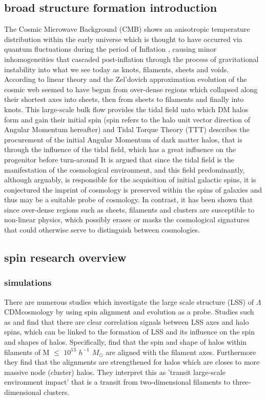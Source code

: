 \documentclass[a4paper,fleqn,usenatbib]{mnras}
\def \lcdm{$\Lambda$CDM}
\begin{document}
\subsection{broad structure formation introduction}
The Cosmic Microwave Background (CMB) shows an anisotropic temperature distribution within the early universe which is thought to have occurred via quantum fluctuations during the period of Inflation \citep{Guth_82}, causing minor inhomogeneities that cascaded post-inflation through the process of gravitational instability into what we see today as knots, filaments, sheets and voids. According to linear theory and the Zel'dovich approximation \citep{Zeldovich_70} evolution of the cosmic web seemed to have begun from over-dense regions which collapsed along their shortest axes into sheets, then from sheets to filaments and finally into knots. This large-scale bulk flow provides the tidal field unto which DM halos form and gain their initial spin (spin refers to the halo unit vector direction of Angular Momentum hereafter) and Tidal Torque Theory (TTT) describes the procurement of the initial Angular Momentum of dark matter halos, that is through the influence of the tidal field, which has a great influence on the progenitor before turn-around \citep[Holye 1949][]{Peebles_69,Zeldovich_70} 
It is argued that since the tidal field is the manifestation of the cosmological environment, and this field predominantly, although arguably, is responsible for the acquisition of initial galactic spins, it is conjectured the imprint of cosmology is preserved within the spins of galaxies \citep{Lee_pen_00} and thus may be a suitable probe of cosmology. In contrast, it has been shown that since over-dense regions such as sheets, filaments and clusters are susceptible to non-linear physics, which possibly erases or masks the cosmological signatures that could otherwise serve to distinguish between cosmologies.

\subsection{spin research overview}
\subsubsection{simulations}
There are numerous studies which investigate the large scale structure (LSS) of \lcdm cosmology by using spin alignment and evolution as a probe. Studies such as \citet{Faltenbacher_02,Calvo_07,Zhang_09} and \citet{Hahn_07} find that there are clear correlation signals between LSS axes and halo spins, which can be linked to the formation of LSS and its influence on the spin and shapes of halos. Specifically, \citet{Zhang_09} find that the spin and shape of halos within filaments of M $\leq$ $10^{13}$ $h^{-1}$ \(M_\odot\) are aligned with the filament axes. Furthermore they find that the alignments are strengthened for halos which are closes to more massive node (cluster) halos. They interpret this as 'transit large-scale environment impact' that is a transit from two-dimensional filaments to three-dimensional clusters.
\end{document}
